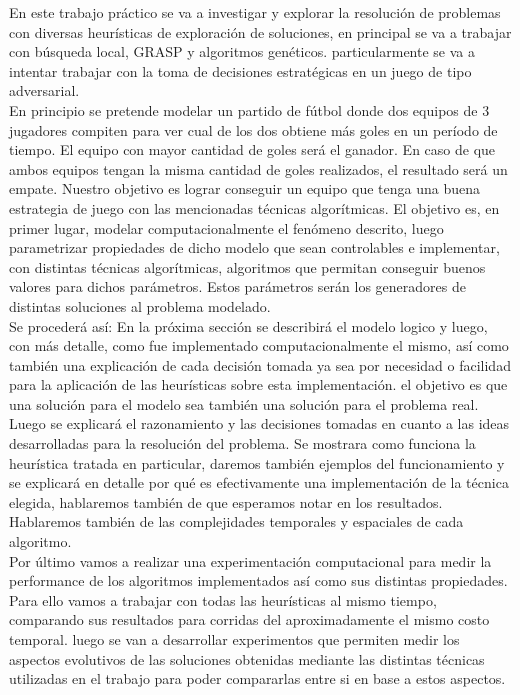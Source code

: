 
En este trabajo práctico se va a investigar y explorar la resolución de problemas con
diversas heurísticas de exploración de soluciones, en principal se va a trabajar
con búsqueda local, GRASP y algoritmos genéticos. particularmente se va a intentar trabajar
con la toma de decisiones estratégicas en un juego de tipo adversarial.\\


En principio se pretende modelar un partido de fútbol donde dos equipos de 3
jugadores compiten para ver cual de los dos obtiene más goles en un período de tiempo. El
equipo con mayor cantidad de goles será el ganador. En caso de que ambos equipos tengan
la misma cantidad de goles realizados, el resultado será un empate. Nuestro objetivo es lograr
conseguir un equipo que tenga una buena estrategia de juego con las mencionadas técnicas
algorítmicas. El objetivo es, en primer lugar, modelar computacionalmente el fenómeno descrito, luego
parametrizar propiedades de dicho modelo que sean controlables e implementar, con distintas técnicas
algorítmicas, algoritmos que permitan conseguir buenos valores para dichos parámetros. Estos parámetros
serán los generadores de distintas soluciones al problema modelado.
\\


Se procederá así:
En la próxima sección se describirá el modelo logico y luego, con más detalle, como fue implementado
computacionalmente el mismo,
así como también una explicación de cada decisión tomada ya sea por necesidad o facilidad para
la aplicación de las heurísticas sobre esta implementación. el objetivo es que una solución
para el modelo sea también una solución para el problema real.
\\


Luego se explicará el razonamiento y las decisiones tomadas en cuanto a las ideas desarrolladas para
la resolución del problema. Se mostrara como funciona la heurística tratada en particular,
daremos también ejemplos del funcionamiento y se explicará en detalle por qué es
efectivamente una implementación de la técnica elegida, hablaremos también de que esperamos notar
en los resultados.
Hablaremos también de las complejidades temporales y espaciales de cada algoritmo.
\\


Por último vamos a realizar una experimentación computacional para medir la performance de
los algoritmos implementados así como sus distintas propiedades. Para ello vamos a trabajar con
todas las heurísticas al mismo tiempo, comparando sus resultados para corridas del aproximadamente
el mismo costo temporal. luego se van a desarrollar experimentos que permiten medir los aspectos
evolutivos de las soluciones obtenidas mediante las distintas técnicas utilizadas en
el trabajo para poder compararlas entre si en base a estos aspectos.\\
